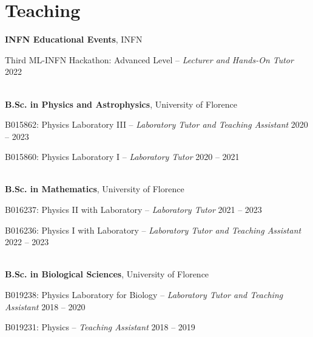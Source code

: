 \newcommand{\teaching}[2]
  {\normalsize \textbf{\color{hlcolor-0} #1}, {\color{hlcolor-1} #2}}
  
\newcommand{\teachclass}[3]
  {{\normalsize \color{maincolor} #1 --}
  {\small \color{maincolor} \emph{#2}} \hfill 
  {\normalsize \color{hlcolor-2} #3}}


\section*{Teaching}
\begin{cvcontent}
  \teaching{INFN Educational Events}{INFN}
  \\ [1mm]
  \begin{itemize*}[label=\textcolor{iconcolor}{\textbullet}]
    \item \teachclass{Third ML-INFN Hackathon: Advanced Level}
      {Lecturer and Hands-On Tutor}{2022}
  \end{itemize*}
  \\ [4mm]
  \teaching{B.Sc. in Physics and Astrophysics}{University of Florence}
  \\ [1mm]
  \begin{itemize*}[label=\textcolor{iconcolor}{\textbullet}]
    \item \teachclass{B015862: Physics Laboratory III}
      {Laboratory Tutor and Teaching Assistant}{2020 -- 2023}\\ [0.5mm]
    \item \teachclass{B015860: Physics Laboratory I}
      {Laboratory Tutor}{2020 -- 2021}
  \end{itemize*}
  \\ [4mm]
  \teaching{B.Sc. in Mathematics}{University of Florence}
  \\ [1mm]
  \begin{itemize*}[label=\textcolor{iconcolor}{\textbullet}]
    \item \teachclass{B016237: Physics II with Laboratory}
      {Laboratory Tutor}{2021 -- 2023}\\ [0.5mm]
    \item \teachclass{B016236: Physics I with Laboratory}
      {Laboratory Tutor and Teaching Assistant}{2022 -- 2023}
  \end{itemize*}
  \\ [4mm]
  \teaching{B.Sc. in Biological Sciences}{University of Florence}
  \\ [1mm]
  \begin{itemize*}[label=\textcolor{iconcolor}{\textbullet}]
    \item \teachclass{B019238: Physics Laboratory for Biology}
      {Laboratory Tutor and Teaching Assistant}{2018 -- 2020}\\ [0.5mm]
    \item \teachclass{B019231: Physics}
      {Teaching Assistant}{2018 -- 2019}
  \end{itemize*}
\end{cvcontent}